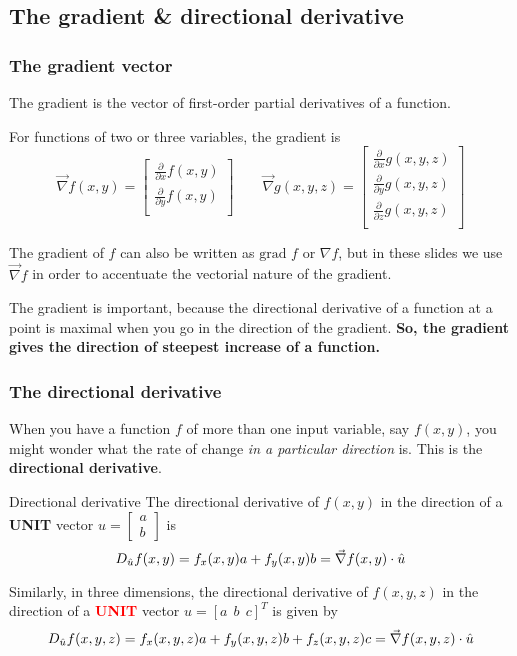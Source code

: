     \subsection{The gradient \& directional derivative}
\begin{frame}
\frametitle{The gradient vector}

The gradient is the vector of first-order partial derivatives of a function.

For functions of two or three variables, the gradient is
\[\vec{\nabla} f(x,y) =
\begin{bmatrix}
\frac{\partial}{\partial x} f(x,y)\\
\frac{\partial}{\partial y} f(x,y)\\
\end{bmatrix}
\qquad
\vec{\nabla} g(x,y,z) =
\begin{bmatrix}
\frac{\partial}{\partial x} g(x,y,z)\\
\frac{\partial}{\partial y} g(x,y,z)\\
\frac{\partial}{\partial z} g(x,y,z)\\
\end{bmatrix}
\]


\pause The gradient of $f$ can also be written as $\text{grad } f$ or $\nabla f$, but in these slides we use $\vec{\nabla} f$ in order to accentuate the vectorial nature of the gradient.

\pause The gradient is important, because the directional derivative of a function at a point is maximal when you go in the direction of the gradient. \textbf{So, the gradient gives the direction of steepest increase of a function.}

\end{frame}


\begin{frame}
\frametitle{The directional derivative}

When you have a function $f$ of more than one input variable, say $f(x,y)$, you might wonder what the rate of change \textit{in a particular direction} is. This is the \textbf{directional derivative}.
    \begin{theorybox}{Directional derivative}
    The directional derivative of $f(x,y)$ in the direction of a \textbf{UNIT} vector $\hat{u}=\begin{bmatrix}a\\b\end{bmatrix}$ is
    \[D_{\hat{u}}f(x,y)=f_x(x,y)a+f_y(x,y)b=\vec{\nabla} f(x,y)\cdot\hat{u}\]

    Similarly, in three dimensions, the directional derivative of $f(x,y,z)$ in the direction of a \textbf{\textcolor{red}{UNIT}} vector $\hat{u}=[a~~b~~c]^T$ is given by
    \[D_{\hat{u}}f(x,y,z)=f_x(x,y,z)a+f_y(x,y,z)b+f_z(x,y,z)c=\vec{\nabla} f(x,y,z)\cdot\hat{u}\]
    
\end{theorybox}
\end{frame}

